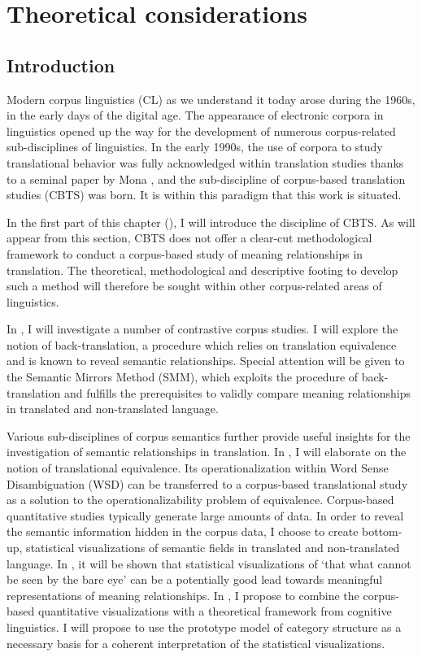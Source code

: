 \chapter{Theoretical considerations}
\label{sec:2}

\section{Introduction}
\label{sec:2.1}  
Modern corpus linguistics (CL) as we understand it today arose during the 1960s, in the early days of the digital age. The appearance of electronic corpora in linguistics opened up the way for the development of numerous corpus-related sub-disciplines of linguistics. In the early 1990s, the use of corpora to study translational behavior was fully acknowledged within translation studies thanks to a seminal paper by Mona \citet{baker_corpus_1993}, and the sub-discipline of corpus-based translation studies (CBTS) was born. It is within this paradigm that this work is situated.

In the first part of this chapter (), I will introduce the discipline of CBTS. As will appear from this section, CBTS does not offer a clear-cut methodological framework to conduct a corpus-based study of meaning relationships in translation. The theoretical, methodological and descriptive footing to develop such a method will therefore be sought within other corpus-related areas of linguistics.

In , I will investigate a number of contrastive corpus studies. I will explore the notion of back-translation, a procedure which relies on translation equivalence and is known to reveal semantic relationships. Special attention will be given to the Semantic Mirrors Method (SMM), which exploits the procedure of back-translation and fulfills the prerequisites to validly compare meaning relationships in translated and non-translated language.

Various sub-disciplines of corpus semantics further provide useful insights for the investigation of semantic relationships in translation. In , I will elaborate on the notion of translational equivalence. Its operationalization within Word Sense Disambiguation (WSD) can be transferred to a corpus-based translational study as a solution to the operationalizability problem of equivalence. Corpus-based quantitative studies typically generate large amounts of data. In order to reveal the semantic information hidden in the corpus data, I choose to create bottom-up, statistical visualizations of semantic fields in translated and non-translated language. In , it will be shown that statistical visualizations of ‘that what cannot be seen by the bare eye’ can be a potentially good lead towards meaningful representations of meaning relationships. In , I propose to combine the corpus-based quantitative visualizations with a theoretical framework from cognitive linguistics. I will propose to use the prototype model of category structure as a necessary basis for a coherent interpretation of the statistical visualizations.

